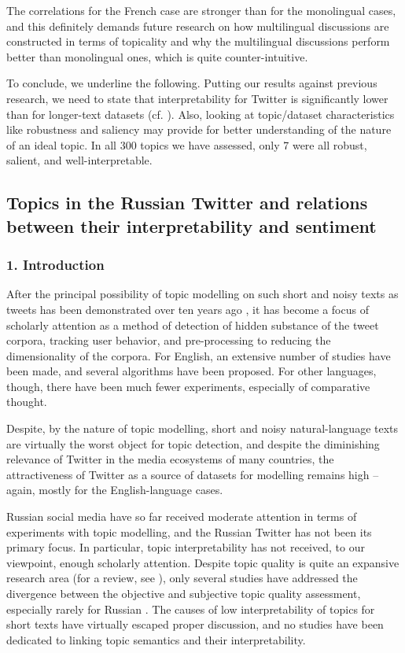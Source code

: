 The correlations for the French case are stronger than for the monolingual cases, and this definitely demands future research on how multilingual discussions are constructed in terms of topicality and why the multilingual discussions perform better than monolingual ones, which is quite counter-intuitive.

To conclude, we underline the following. Putting our results against previous research, we need to state that interpretability for Twitter is significantly lower than for longer-text datasets (cf. \cite{KoltsovaKoltcov}). Also, looking at topic/dataset characteristics like robustness and saliency may provide for better understanding of the nature of an ideal topic. In all 300 topics we have assessed, only 7 were all robust, salient, and well-interpretable.

\subsection{Topics in the Russian Twitter and relations between their interpretability and sentiment}\label{subsec:ch5/sec2/sub4}

\subsubsection{1. Introduction}

After the principal possibility of topic modelling on such short and noisy texts as tweets has been demonstrated over ten years ago \cite{RamageDumaisLiebling}, it has become a focus of scholarly attention as a method of detection of hidden substance of the tweet corpora, tracking user behavior, and pre-processing to reducing the dimensionality of the corpora. For English, an extensive number of studies have been made, and several algorithms have been proposed. For other languages, though, there have been much fewer experiments, especially of comparative thought.

Despite, by the nature of topic modelling, short and noisy natural-language texts are virtually the worst object for topic detection, and despite the diminishing relevance of Twitter in the media ecosystems of many countries, the attractiveness of Twitter as a source of datasets for modelling remains high -- again, mostly for the English-language cases.

Russian social media have so far received moderate attention in terms of experiments with topic modelling, and the Russian Twitter has not been its primary focus. In particular, topic interpretability has not received, to our viewpoint, enough scholarly attention. Despite topic quality is quite an expansive research area (for a review, see \cite{MavrinFilchenkovKoltcov}), only several studies have addressed the divergence between the objective and subjective topic quality assessment, especially rarely for Russian \cite{BodrunovaKoltcovKoltsova}. The causes of low interpretability of topics for short texts have virtually escaped proper discussion, and no studies have been dedicated to linking topic semantics and their interpretability.

